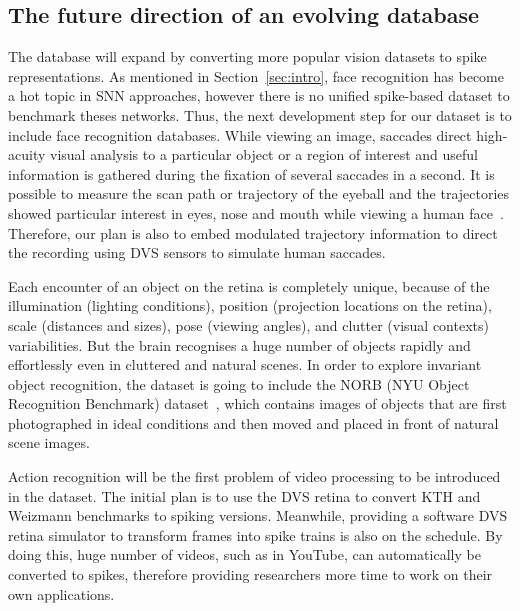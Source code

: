\subsection{The future direction of an evolving database}
The database will expand by converting more popular vision datasets to spike representations.
As mentioned in Section~\ref{sec:intro}, face recognition has become a hot topic in SNN approaches, however there is no unified spike-based dataset to benchmark theses networks.
Thus, the next development step for our dataset is to include face recognition databases.
While viewing an image,  saccades direct high-acuity visual analysis to a particular object or a region of interest and useful information is gathered during the fixation of several saccades in a second.
It is possible to measure the scan path or trajectory of the eyeball and the trajectories showed particular interest in eyes, nose and mouth while viewing a human face~\citep{yarbus1967eye}.
Therefore, our plan is also to embed modulated trajectory information to direct the recording using DVS sensors to simulate human saccades.


Each encounter of an object on the retina is completely unique, because of the illumination (lighting conditions), position (projection locations on the retina), scale (distances and sizes), pose (viewing angles), and clutter (visual contexts) variabilities.
But the brain recognises a huge number of objects rapidly and effortlessly even in cluttered and natural scenes.
In order to explore invariant object recognition, the dataset is going to include the NORB (NYU Object Recognition Benchmark) dataset~\citep{lecun2004learning}, which contains images of objects that are first photographed in ideal conditions and then moved and placed in front of natural scene images.

Action recognition will be the first problem of video processing to be introduced in the dataset.
The initial plan is to use the DVS retina to convert KTH and Weizmann benchmarks to spiking versions.
Meanwhile, providing a software DVS retina simulator to transform  frames into spike trains is also on the schedule.
By doing this, huge number of videos, such as in YouTube, can automatically be converted to spikes, therefore providing researchers more time to work on their own applications.


